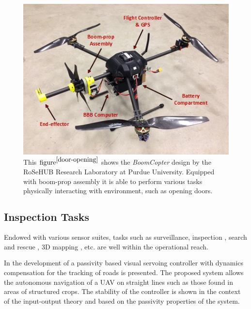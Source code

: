 \begin{figure}[H]
	\includegraphics[width=0.95\columnwidth]{figure/BoomCopter.jpg}	
	\centering
	\caption{This $\text{figure}^{\cite{door-opening}}$ shows the \textit{BoomCopter} design by the RoSeHUB Research Laboratory at Purdue University. Equipped with boom-prop assembly it is able to perform various tasks physically interacting with environment, such as opening doors. }
	\label{fig:boom_copter}
\end{figure}

\subsection{Inspection Tasks}

Endowed with various sensor suites, tasks such as surveillance, inspection \cite{ref:corosion-inspection}\cite{ref:inspection-overview}\cite{Ollero2018}, search and rescue \cite{ref:sar}, 3D mapping \cite{ref:lidar-equipped-model-building}, etc. are well within  the operational reach.

In \cite{passivity-based-crop} the development of a passivity based visual servoing controller with dynamics compensation for the tracking of roads is presented. The proposed system allows the autonomous navigation of a UAV on straight lines such as those found in areas of structured crops. The stability of the controller is shown in the context of the input-output theory and based on the passivity properties of the system.

